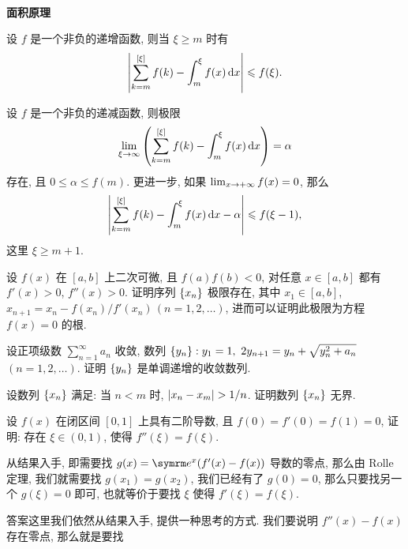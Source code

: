 \begin{exercise}[series=exer]
\begin{align*}
    \end{align*}
    \item \textbf{面积原理}
    \begin{exercise}
        \item 设 $ f $ 是一个非负的递增函数, 则当 $ \xi \ge m $ 时有
        \begin{align*}
            \abs{\sum_{k = m}^{[\xi]} f(k) - \int_{m}^{\xi} f(x) \dd{x}} \leqslant f(\xi).
        \end{align*}
        \item 设 $ f $ 是一个非负的递减函数, 则极限
        \begin{align*}
            \lim_{\xi \to \infty} \qty(\sum_{k = m}^{[\xi]} f(k) - \int_{m}^{\xi} f(x) \dd{x}) = \alpha
        \end{align*}
        存在, 且 $ 0 \le \alpha \le f(m) $. 更进一步, 如果 $ \lim_{x \to +\infty} f(x) = 0 $, 那么
        \begin{align*}
            \abs{\sum_{k = m}^{[\xi]} f(k) - \int_{m}^{\xi} f(x) \dd{x} - \alpha} \leqslant f(\xi - 1),
        \end{align*} 
        这里 $ \xi \ge m + 1 $. 
    \end{exercise}
    \item 设 $ f(x) $ 在 $ [a, b] $ 上二次可微, 且 $ f(a)f(b) < 0 $, 对任意 $ x \in [a, b] $ 都有 $ f'(x) > 0 $, $ f''(x) > 0 $. 证明序列 $ \qty{x_{n}} $ 极限存在, 其中 $ x_{1} \in [a, b] $, $ x_{n + 1} = x_{n} - f(x_{n})/f'(x_{n})\,(n = 1, 2, \dots) $, 进而可以证明此极限为方程 $ f(x) = 0 $ 的根. 
    \item 设正项级数 $ \sum_{n = 1}^{\infty} a_{n} $ 收敛, 数列 $ \qty{y_{n}} : y_{1} = 1,\ 2y_{n + 1} = y_{n} + \sqrt{y_{n}^{2} + a_{n}} $\, $ (n = 1, 2, \dots) $. 证明 $ \qty{y_{n}} $ 是单调递增的收敛数列. 
    \item 设数列 $ \qty{x_{n}} $ 满足: 当 $ n < m $ 时, $ \abs{x_{n} - x_{m}} > 1/n $. 证明数列 $ \qty{x_{n}} $ 无界.
    \item 设 $ f(x) $ 在闭区间 $ [0, 1] $ 上具有二阶导数, 且 $ f(0) = f'(0) = f(1) = 0 $, 证明: 存在 $ \xi \in (0, 1) $, 使得 $ f''(\xi) = f(\xi) $.
    \begin{hint}
        从结果入手, 即需要找 $ g(x) = \me^{x}(f'(x) - f(x)) $ 导数的零点, 那么由 Rolle 定理, 我们就需要找 $ g(x_{1}) = g(x_{2}) $, 我们已经有了 $ g(0) = 0 $, 那么只要找另一个 $ g(\xi) = 0 $ 即可, 也就等价于要找 $ \xi $ 使得 $ f'(\xi) = f(\xi) $.
    \end{hint}
    \begin{answer}
        答案这里我们依然从结果入手, 提供一种思考的方式. 我们要说明 $ f''(x) - f(x) $ 存在零点, 那么就是要找

\end{answer}
\end{exercise}
